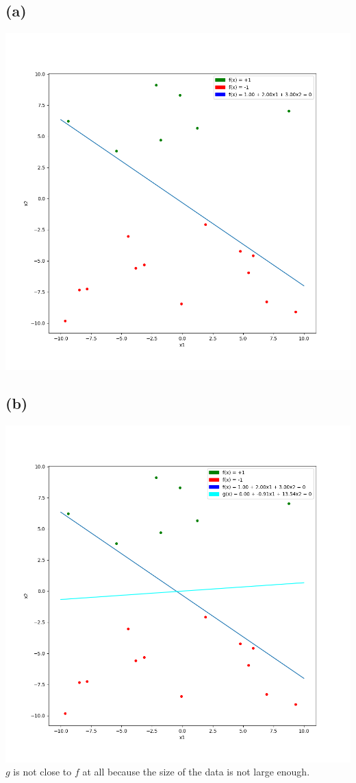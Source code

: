 \documentclass{article}
\begin{document}
	\subsection*{(a)}
		\includegraphics[scale=0.7]{p1.4a.png}
	\subsection*{(b)}
		\includegraphics[scale=0.7]{p1.4b.png}\\
		$g$ is not close to $f$ at all because the size of the data is not large enough.
\end{document}
